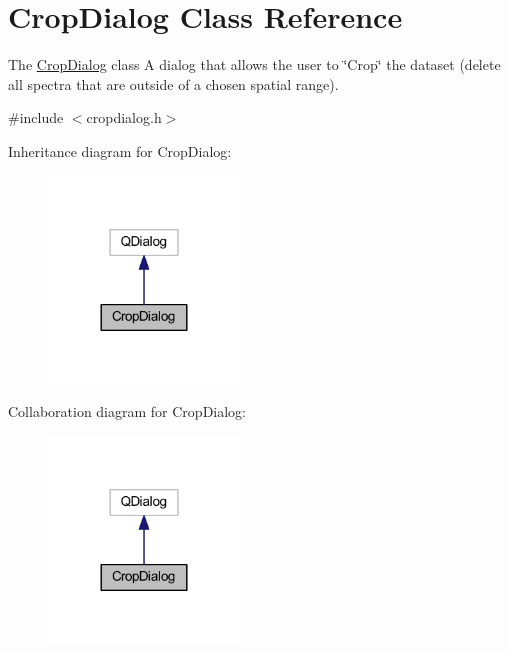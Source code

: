 \hypertarget{class_crop_dialog}{\section{Crop\+Dialog Class Reference}
\label{class_crop_dialog}
}


The \hyperlink{class_crop_dialog}{Crop\+Dialog} class A dialog that allows the user to \char`\"{}\+Crop\char`\"{} the dataset (delete all spectra that are outside of a chosen spatial range).  




{\ttfamily \#include $<$cropdialog.\+h$>$}



Inheritance diagram for Crop\+Dialog\+:\nopagebreak
\begin{figure}[H]
\begin{center}
\leavevmode
\includegraphics[width=144pt]{class_crop_dialog__inherit__graph}
\end{center}
\end{figure}


Collaboration diagram for Crop\+Dialog\+:\nopagebreak
\begin{figure}[H]
\begin{center}
\leavevmode
\includegraphics[width=144pt]{class_crop_dialog__coll__graph}
\end{center}
\end{figure}
